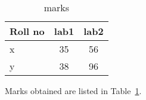 \documentclass{article}  %
\begin{document}
 
\begin{table} 
 
\begin{tabular}{|l|c|c|} \hline 
Roll no & lab1 & lab2 \\ \hline
x       & 35 & 56 \\ \hline
y       & 38 & 96 \\ \hline
\end{tabular} 
 
 
 
\caption{marks}
\label{performance}
\end{table} 
 
 
 
 
 
Marks obtained are listed in Table~\ref{performance}.
 
\end{document}
